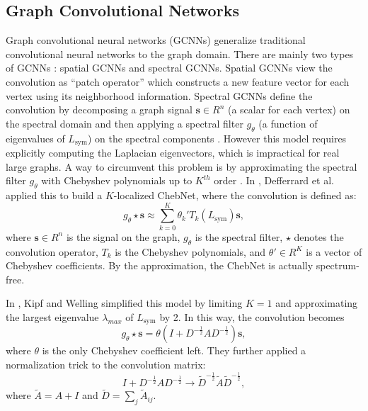\documentclass[letterpaper]{article} \usepackage{aaai18}  \usepackage{times}  \usepackage{helvet}  \usepackage{courier}  \usepackage{url}  \usepackage{graphicx}  \usepackage{algorithm}
\begin{document}
\subsection{Graph Convolutional Networks}

Graph convolutional neural networks (GCNNs) generalize traditional convolutional neural networks to the graph domain. There are mainly two types of GCNNs \cite{bronstein2017geometric}: spatial GCNNs and spectral GCNNs. Spatial GCNNs view the convolution as ``patch operator'' which constructs a new feature vector for each vertex using its neighborhood information. Spectral GCNNs define the convolution by decomposing a graph signal $\mathbf{s} \in R^n$ (a scalar for each vertex) on the spectral domain and then applying a spectral filter $g_{\theta}$ (a function of eigenvalues of $L_{\mathrm{sym}}$) on the spectral components \cite{bruna2013spectral,sandryhaila2013discrete,shuman2013emerging}. However this model requires explicitly computing the Laplacian eigenvectors, which is impractical for real large graphs. A way to circumvent this problem is by approximating the spectral filter $g_{\theta}$ with Chebyshev polynomials up to $K^{th}$ order \cite{hammond2011wavelets}. In \cite{defferrard2016convolutional}, Defferrard et al. applied this to build a $K$-localized ChebNet, where the convolution is defined as:
\begin{equation}\label{eq:cheby}
g_{\theta} \star \mathbf{s} \approx  \sum_{k=0}^K \theta_k' T_k(L_{\mathrm{sym}}) \mathbf{s},
\end{equation}
where $\mathbf{s} \in R^n$ is the signal on the graph, $g_{\theta}$ is the spectral filter, $\star$ denotes the convolution operator, $T_k$ is the Chebyshev polynomials, and $\theta'\in R^K$ is a vector of Chebyshev coefficients. By the approximation, the ChebNet is actually spectrum-free.




In \cite{kipf2016semi}, Kipf and Welling simplified this model by limiting $K=1$ and approximating the largest eigenvalue $\lambda_{max}$ of $L_{\mathrm{sym}}$ by 2. In this way, the convolution becomes
\begin{equation}
\label{eq:kipfnew}
g_{\theta} \star \mathbf{s} = \theta \left(I + D^{-\frac{1}{2}} A D^{-\frac{1}{2}} \right) \mathbf{s},
\end{equation}
where $\theta$ is the only Chebyshev coefficient left. They further applied a normalization trick to the convolution matrix:
\begin{equation}
\label{eq:normalization}
I + D^{-\frac{1}{2}} A D^{-\frac{1}{2}} \rightarrow  \tilde{D}^{-\frac{1}{2}}\tilde{A}\tilde{D}^{-\frac{1}{2}},
\end{equation}
where $\tilde{A}=A+I$ and $\tilde{D}=\sum_j \tilde{A}_{ij} $.
\end{document}
